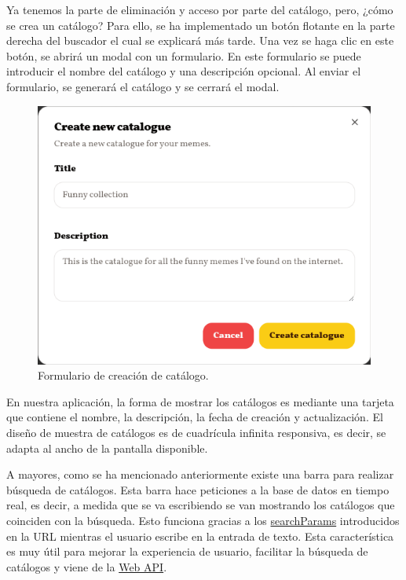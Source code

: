Ya tenemos la parte de eliminación y acceso por parte del catálogo, pero, ¿cómo se crea un catálogo? Para ello, se ha implementado un botón flotante en la parte derecha del buscador el cual se explicará más tarde. Una vez se haga clic en este botón, se abrirá un modal con un formulario. En este formulario se puede introducir el nombre del catálogo y una descripción opcional. Al enviar el formulario, se generará el catálogo y se cerrará el modal.

\begin{figure}[H]
    \caption{Formulario de creación de catálogo.}
    \centering
    \vspace*{0.5cm}
    \includegraphics[scale=0.3]{figuras/card_creacion_catalogo.png}
\end{figure}

En nuestra aplicación, la forma de mostrar los catálogos es mediante una tarjeta que contiene el nombre, la descripción, la fecha de creación y actualización. El diseño de muestra de catálogos es de cuadrícula infinita responsiva, es decir, se adapta al ancho de la pantalla disponible.

A mayores, como se ha mencionado anteriormente existe una barra para realizar búsqueda de catálogos. Esta barra hace peticiones a la base de datos en tiempo real, es decir, a medida que se va escribiendo se van mostrando los catálogos que coinciden con la búsqueda. Esto funciona gracias a los \href{https://developer.mozilla.org/en-US/docs/Web/API/URL/searchParams}{searchParams} introducidos en la URL mientras el usuario escribe en la entrada de texto. Esta característica es muy útil para mejorar la experiencia de usuario, facilitar la búsqueda de catálogos y viene de la \href{https://developer.mozilla.org/en-US/docs/Web/API}{Web API}.

